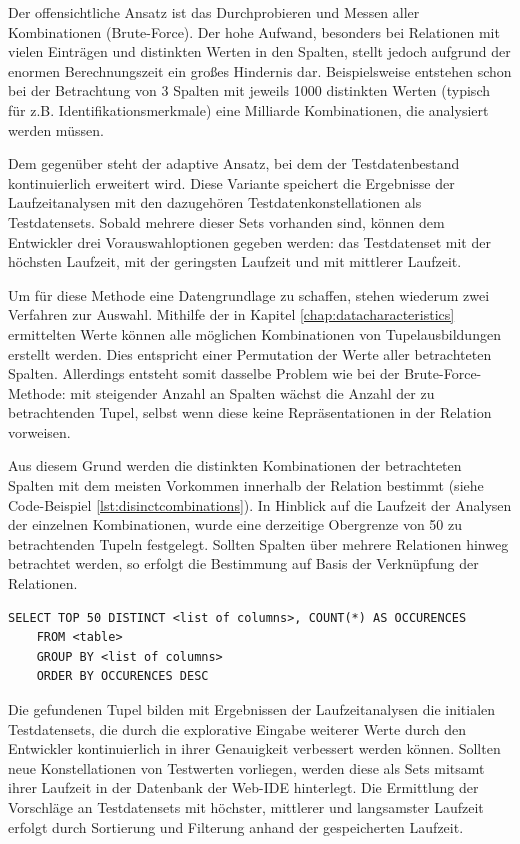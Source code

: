 Der offensichtliche Ansatz ist das Durchprobieren und Messen aller Kombinationen (Brute-Force).
Der hohe Aufwand, besonders bei Relationen mit vielen Einträgen und distinkten Werten in den Spalten, stellt jedoch aufgrund der enormen Berechnungszeit ein großes Hindernis dar.
Beispielsweise entstehen schon bei der Betrachtung von 3 Spalten mit jeweils 1000 distinkten Werten (typisch für z.B. Identifikationsmerkmale) eine Milliarde Kombinationen, die analysiert werden müssen.

Dem gegenüber steht der adaptive Ansatz, bei dem der Testdatenbestand kontinuierlich erweitert wird.
Diese Variante speichert die Ergebnisse der Laufzeitanalysen mit den dazugehören Testdatenkonstellationen als Testdatensets.
Sobald mehrere dieser Sets vorhanden sind, können dem Entwickler drei Vorauswahloptionen gegeben werden: das Testdatenset mit der höchsten Laufzeit, mit der geringsten Laufzeit und mit mittlerer Laufzeit.

Um für diese Methode eine Datengrundlage zu schaffen, stehen wiederum zwei Verfahren zur Auswahl.
Mithilfe der in Kapitel \ref{chap:datacharacteristics} ermittelten Werte können alle möglichen Kombinationen von Tupelausbildungen erstellt werden.
Dies entspricht einer Permutation der Werte aller betrachteten Spalten.
Allerdings entsteht somit dasselbe Problem wie bei der Brute-Force-Methode: mit steigender Anzahl an Spalten wächst die Anzahl der zu betrachtenden Tupel, selbst wenn diese keine Repräsentationen in der Relation vorweisen.

Aus diesem Grund werden die distinkten Kombinationen der betrachteten Spalten mit dem meisten Vorkommen innerhalb der Relation bestimmt (siehe Code-Beispiel \ref{lst:disinctcombinations}).
In Hinblick auf die Laufzeit der Analysen der einzelnen Kombinationen, wurde eine derzeitige Obergrenze von 50 zu betrachtenden Tupeln festgelegt.
Sollten Spalten über mehrere Relationen hinweg betrachtet werden, so erfolgt die Bestimmung auf Basis der Verknüpfung der Relationen.

\begin{lstlisting}[caption={Bestimmung distinkter Tupel anhand gegebener Spalten}, label={lst:disinctcombinations}, language=mySQL, deletekeywords={schema, table, TABLE}]
	SELECT TOP 50 DISTINCT <list of columns>, COUNT(*) AS OCCURENCES
	FROM <table>
	GROUP BY <list of columns>
	ORDER BY OCCURENCES DESC
\end{lstlisting}

Die gefundenen Tupel bilden mit Ergebnissen der Laufzeitanalysen die initialen Testdatensets, die durch die explorative Eingabe weiterer Werte durch den Entwickler kontinuierlich in ihrer Genauigkeit verbessert werden können.
Sollten neue Konstellationen von Testwerten vorliegen, werden diese als Sets mitsamt ihrer Laufzeit in der Datenbank der Web-IDE hinterlegt.
Die Ermittlung der Vorschläge an Testdatensets mit höchster, mittlerer und langsamster Laufzeit erfolgt durch Sortierung und Filterung anhand der gespeicherten Laufzeit.

